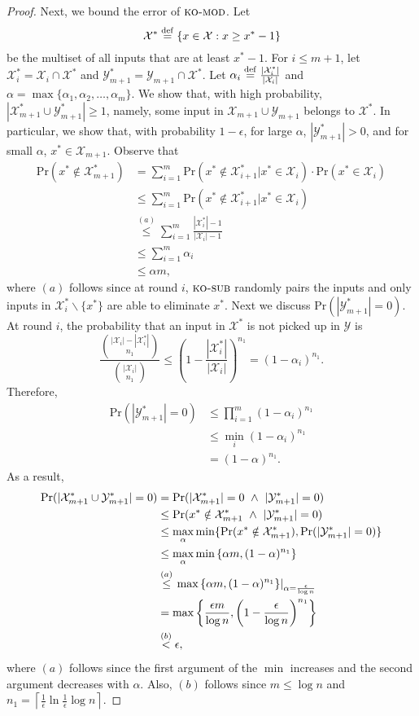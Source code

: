 \documentclass[twoside,11pt]{article}
\newcommand{\df}[1][\rm{def}]{\stackrel{#1}{=}}
\newcommand{\cY}{\mathcal{Y}}
\newcommand{\cX}{\mathcal{X}}
\newcommand{\pr}{\text{Pr}}
\newcommand{\algorithms}[1]{\textsc{#1}}
\newcommand{\algkosub}{\algorithms{ko-sub}}
\newcommand{\algkomod}{\algorithms{ko-mod}}
\newcommand{\maxx}{x^*}
\newcommand{\errorcomb}{\epsilon}
\begin{document}
\begin{proof}
Next, we bound the error of $\algkomod$. Let
 \[
  \cX^*\df\{x\in\cX:x\ge\maxx-1\}
 \]
be the multiset of all inputs that are at least $\maxx-1$. For $i \le m+1$, let 
$\cX_i^*=\cX_i \cap \cX^*$ and $\cY_{m+1}^*=\cY_{m+1} \cap \cX^*$.
Let $\alpha_i\df\frac{|\cX_i^*|}{|\cX_i|}$ and $\alpha=\max\{\alpha_1,\alpha_2,\ldots,\alpha_m\}$.
We show that, with high probability, $|\cX_{m+1}^*\cup\cY_{m+1}^*| \ge 1$, 
namely, some input in $\cX_{m+1}\cup\cY_{m+1}$ belongs to $\cX^*$.
In particular, we show that, with probability $1-\errorcomb$, for large $\alpha$,
$|\cY^*_{m+1}| > 0$, and for small $\alpha$,
$\maxx\in \cX_{m+1}$. Observe that
 \begin{align*}
 \pr(\maxx\notin\cX_{m+1}^*) &= \sum_{i=1}^m \pr(\maxx\notin\cX_{i+1}^*|\maxx \in \cX_i)\cdot\pr(\maxx \in \cX_i)\\
  &\le \sum_{i=1}^m \pr(\maxx\notin\cX_{i+1}^*|\maxx \in \cX_i)\\
  &\stackrel{(a)}{\le} \sum_{i=1}^m \frac{|\cX_i^*|-1}{|\cX_i|-1}\\
  &\le \sum_{i=1}^m \alpha_i\\
  &\le \alpha m,
 \end{align*}
where $(a)$ follows since at round $i$, $\algkosub$ randomly pairs the inputs and only inputs in
$\cX_{i}^*\backslash \{\maxx\}$ are able to eliminate $\maxx$. Next we discuss $\pr(|\cY_{m+1}^*|=0)$. At round $i$, the probability that an input in $\cX^*$ is not picked up in $\cY$ is
\[
\frac{\binom{|\cX_i|-|\cX_i^*|}{n_1}}{\binom{|\cX_i|}{n_1}}\le \left(1-\frac{|\cX_i^*|}{|\cX_i|}\right)^{n_1}=
\left(1-\alpha_i\right)^{n_1}.
\]
Therefore, 
 \begin{align*}
  \pr(|\cY_{m+1}^*|=0)&\le \prod_{i=1}^m (1-\alpha_i)^{n_1}\\
  &\le \min_i (1-\alpha_i)^{n_1}\\
  &=(1-\alpha)^{n_1}.
 \end{align*}
As a result, 
\begin{align*}
 \pr(|\cX_{m+1}^*\cup\cY_{m+1}^*|=0)&=\pr(|\cX_{m+1}^*|=0\textnormal{ }\land\textnormal{ } |\cY_{m+1}^*|=0)\\
 &\le \pr(\maxx\notin\cX_{m+1}^* \textnormal{ }\land\textnormal{ } |\cY_{m+1}^*|=0)\\
 &\le \max_\alpha \min \{\pr(\maxx\notin\cX_{m+1}^*),\pr(|\cY_{m+1}^*|=0)\}\\
 &\le \max_\alpha \min\left\lbrace \alpha m,(1-\alpha)^{n_1}\right\rbrace\\ 
 &\stackrel {(a)}{\le}   \left.\max\left\lbrace\alpha m,(1-\alpha)^{n_1}\right\rbrace\right|_{\alpha=\frac{\errorcomb}{\log n}}\\
 &=\max\left\lbrace\frac{\errorcomb m}{\log n},\left(1-\frac{\errorcomb}{\log n}\right)^{n_1}\right\rbrace\\
 &\stackrel {(b)}{<}\errorcomb,
\end{align*}
where $(a)$ follows since the first argument of the $\min$
increases and the second argument decreases with $\alpha$. Also, $(b)$
follows since $m\le \log n$ and $n_1 =\left\lceil\frac1\errorcomb\ln
\frac1\errorcomb \log n \right\rceil$.


\end{proof}
\end{document}
